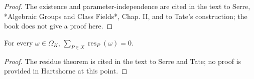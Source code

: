\begin{proof}

The existence and parameter-independence are cited in the text to Serre,
*Algebraic Groups and Class Fields*, Chap. II, and to Tate's construction;
the book does not give a proof here.

\end{proof}
\begin{theorem}\label{ha-ch3-thm-residue-theorem}
For every $\omega\in\Omega_K$, $\sum_{P\in X}\operatorname{res}_P(\omega)=0$.

\end{theorem}
\begin{proof}

The residue theorem is cited in the text to Serre and Tate; no proof is
provided in Hartshorne at this point.

\end{proof}

